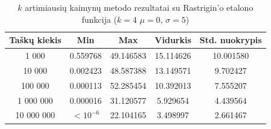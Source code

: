 \begin{table}[H]
    \centering
    \begin{tabular}{|c|c|c|c|c|}
        \hline
        \textbf{Taškų kiekis} & \textbf{Min} & \textbf{Max} & \textbf{Vidurkis} & \textbf{Std. nuokrypis} \\ \hline
        1 000        & 0.559768 & 49.146583 & 15.114626 & 10.001580 \\ \hline
        10 000       & 0.002423 & 48.587388 & 13.149571 & 9.702427 \\ \hline
        100 000      & 0.000113 & 52.285454 & 10.392013 & 7.555207 \\ \hline
        1 000 000    & 0.000016 & 31.120577 & 5.929654 & 4.439564 \\ \hline
        10 000 000   & $<10^{-6}$ & 22.104165 & 3.498997 & 2.661467 \\ \hline
    \end{tabular}
    \caption{$k$ artimiausių kaimynų metodo rezultatai su Rastrigin'o etalono funkcija ($k = 4$ $\mu = 0$, $\sigma = 5$)}
\end{table}
